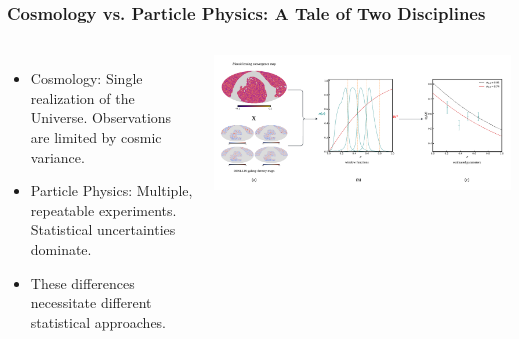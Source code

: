 \documentclass[aspectratio=169]{beamer}
\begin{document}
\begin{frame}
    \frametitle{Cosmology vs. Particle Physics: A Tale of Two Disciplines}
    \begin{columns}
        \begin{itemize}
            \item Cosmology: Single realization of the Universe.  Observations are limited by cosmic variance.
            \item Particle Physics: Multiple, repeatable experiments. Statistical uncertainties dominate.
            \item These differences necessitate different statistical approaches.
        \end{itemize}
        \includegraphics[width=\textwidth]{figures/cross_correlation_schematic_1.pdf}
    \end{columns}
\end{frame}
\end{document}

